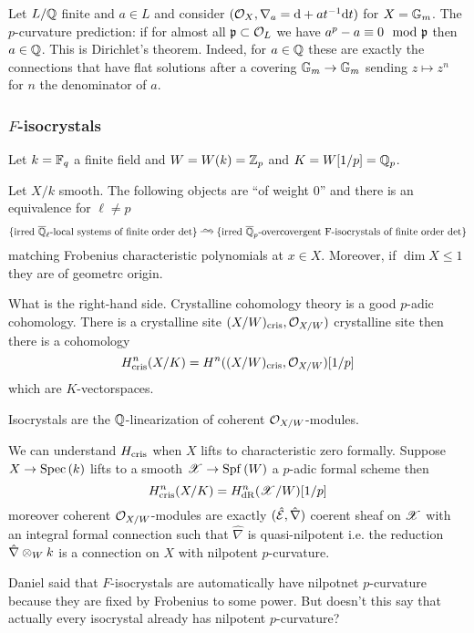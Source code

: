 \documentclass[12pt]{article}
\newcommand{\Spf}[1]{\mathrm{Spf}\left( #1 \right)}
\begin{document}
\begin{example}
Let $L/\mathbb{Q}$ finite and $a \in L$ and consider $(\mathcal{O}_{X}, \nabla_a = \mathrm{d} + a t^{-1} \mathrm{d}{t})$ for $X = \mathbb{G}_m$. The $p$-curvature prediction: if for almost all $\mathfrak{p} \subset \mathcal{O}_{L}$ we have $a^p - a \equiv 0 \mod {\mathfrak{p}}$ then $a \in \mathbb{Q}$. This is Dirichlet's theorem. Indeed, for $a \in \mathbb{Q}$ these are exactly the connections that have flat solutions after a covering $\mathbb{G}_m \to \mathbb{G}_m$ sending $z \mapsto z^n$ for $n$ the denominator of $a$.
\end{example}

\subsubsection{$F$-isocrystals}

Let $k = \mathbb{F}_q$ a finite field and $W = W(k) = \mathbb{Z}_p$ and $K = W[1/p] = \mathbb{Q}_p$. 

\begin{theorem}
Let $X / k$ smooth. The following objects are ``of weight $0$'' and there is an equivalence for $\ell \neq p$
\[ \{ \text{irred } \ol{\Q}_{\ell}\text{-local systems of finite order det} \} \iso \{ \text{irred } \ol{\Q}_p\text{-overcovergent F-isocrystals of finite order det} \} \]
matching Frobenius characteristic polynomials at $x \in X$. Moreover, if $\dim{X} \le 1$ they are of geometrc origin. 
\end{theorem}

What is the right-hand side. Crystalline cohomology theory is a good $p$-adic cohomology. There is a crystalline site $(X/W)_{\mathrm{cris}}, \mathcal{O}_{X/W})$ crystalline site then there is a cohomology
\[ H^n_{\mathrm{cris}}(X/K) = H^n((X/W)_{\mathrm{cris}}, \mathcal{O}_{X/W})[1/p] \]
which are $K$-vectorspaces.

\begin{defn}
Isocrystals are the $\mathbb{Q}$-linearization of coherent $\mathcal{O}_{X/W}$-modules.
\end{defn}

We can understand $H_{\mathrm{cris}}$ when $X$ lifts to characteristic zero formally. Suppose $X \to \mathrm{Spec}\left( k \right)$ lifts to a smooth $\X \to \Spf{W}$ a $p$-adic formal scheme then
\[ H^n_{\mathrm{cris}}(X/K) = H^n_{\mathrm{dR}}(\mathscr{X}/W)[1/p] \]
moreover coherent $\mathcal{O}_{X/W}$-modules are exactly $(\hat{\mathcal{E}}, \hat{\nabla})$ coerent sheaf on $\mathscr{X}$ with an integral formal connection such that $\hat{\nabla}$ is quasi-nilpotent i.e. the reduction $\hat{\nabla} \otimes_W k$ is a connection on $X$ with nilpotent $p$-curvature. 

\begin{rmk}
Daniel said that $F$-isocrystals are automatically have nilpotnet $p$-curvature because they are fixed by Frobenius to some power. But doesn't this say that actually every isocrystal already has nilpotent $p$-curvature? 
\end{rmk}
\end{document}
